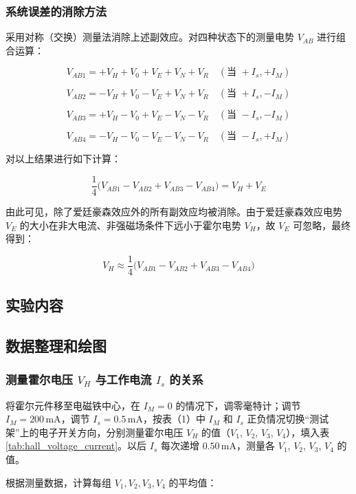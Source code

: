 \documentclass[zihao=5, UTF8]{article}
\theoremstyle{MyLineTheoremStyle} %
\theoremstyle{MyBlockTheoremStyle} %
\theoremstyle{MySubsubsectionStyle} %
\begin{document}
\subsubsection{系统误差的消除方法}

采用对称（交换）测量法消除上述副效应。对四种状态下的测量电势 \( V_{AB} \) 进行组合运算：

\[
V_{AB1} = +V_H + V_0 + V_E + V_N + V_R \quad (\text{当 } +I_s, +I_M)
\]

\[
V_{AB2} = -V_H + V_0 - V_E + V_N + V_R \quad (\text{当 } +I_s, -I_M)
\]

\[
V_{AB3} = +V_H - V_0 + V_E - V_N - V_R \quad (\text{当 } -I_s, -I_M)
\]

\[
V_{AB4} = -V_H - V_0 - V_E - V_N - V_R \quad (\text{当 } -I_s, +I_M)
\]

对以上结果进行如下计算：

\[
\frac{1}{4} \big(V_{AB1} - V_{AB2} + V_{AB3} - V_{AB4}\big) = V_H + V_E
\]

由此可见，除了爱廷豪森效应外的所有副效应均被消除。由于爱廷豪森效应电势 \( V_E \) 的大小在非大电流、非强磁场条件下远小于霍尔电势 \( V_H \)，故 \( V_E \) 可忽略，最终得到：

\[
V_H \approx \frac{1}{4} \big(V_{AB1} - V_{AB2} + V_{AB3} - V_{AB4}\big)
\]


\subsection{实验内容}



\subsection{数据整理和绘图}

\subsubsection{测量霍尔电压 $V_H$ 与工作电流 $I_s$ 的关系}

将霍尔元件移至电磁铁中心，在 $I_M = 0$ 的情况下，调零毫特计；调节 $I_M = 200 \, \text{mA}$，调节 $I_s = 0.5 \, \text{mA}$，按表（1）中 $I_M$ 和 $I_s$ 正负情况切换“测试架”上的电子开关方向，分别测量霍尔电压 $V_H$ 的值（$V_1$, $V_2$, $V_3$, $V_4$），填入表\ref{tab:hall_voltage_current}。以后 $I_s$ 每次递增 $0.50 \, \text{mA}$，测量各 $V_1$, $V_2$, $V_3$, $V_4$ 的值。

根据测量数据，计算每组 $V_1, V_2, V_3, V_4$ 的平均值：
\end{document}
